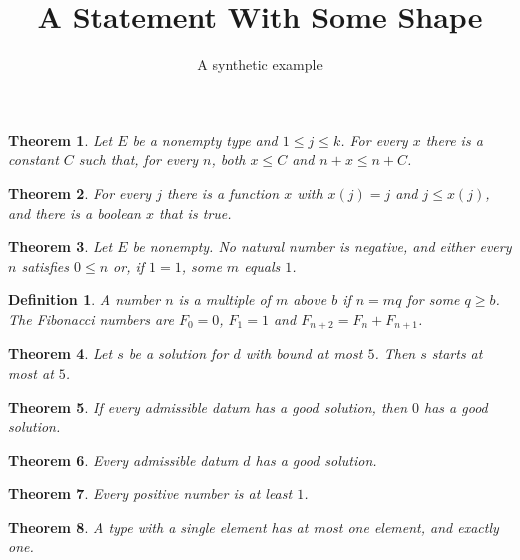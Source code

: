 \documentclass[11pt]{article}
\title{A Statement With Some Shape}
\author{A synthetic example}
\date{}
\newtheorem{theorem}{Theorem}
\newtheorem{definition}{Definition}
\newcommand{\lean}[1]{}
\begin{document}
\maketitle

\begin{theorem}\label{thm:layout}\lean{Shape.layout}
Let $E$ be a nonempty type and $1 \le j \le k$. For every $x$ there is a constant $C$ such that,
for every $n$, both $x \le C$ and $n + x \le n + C$.
\end{theorem}

\begin{theorem}\label{thm:witnesses}\lean{Shape.witnesses}
For every $j$ there is a function $x$ with $x(j) = j$ and $j \le x(j)$, and there is a boolean
$x$ that is true.
\end{theorem}

\begin{theorem}\label{thm:shapes}\lean{Shape.shapes}
Let $E$ be nonempty. No natural number is negative, and either every $n$ satisfies $0 \le n$ or,
if $1 = 1$, some $m$ equals $1$.
\end{theorem}

\begin{definition}\label{def:multiple}\lean{Shape.MultipleAbove}\lean{Shape.fib}
A number $n$ is a multiple of $m$ above $b$ if $n = mq$ for some $q \ge b$. The Fibonacci numbers
are $F_0 = 0$, $F_1 = 1$ and $F_{n+2} = F_n + F_{n+1}$.
\end{definition}

\begin{theorem}\label{thm:supplied}\lean{Shape.supplied}
Let $s$ be a solution for $d$ with bound at most $5$. Then $s$ starts at most at $5$.
\end{theorem}

\begin{theorem}\label{thm:assumed}\lean{Shape.assumed}
If every admissible datum has a good solution, then $0$ has a good solution.
\end{theorem}

\begin{theorem}\label{thm:produced}\lean{Shape.produced}
Every admissible datum $d$ has a good solution.
\end{theorem}

\begin{theorem}\label{thm:positive}\lean{Shape.positive}
Every positive number is at least $1$.
\end{theorem}

\begin{theorem}\label{thm:single}\lean{Shape.single}
A type with a single element has at most one element, and exactly one.
\end{theorem}
\end{document}

